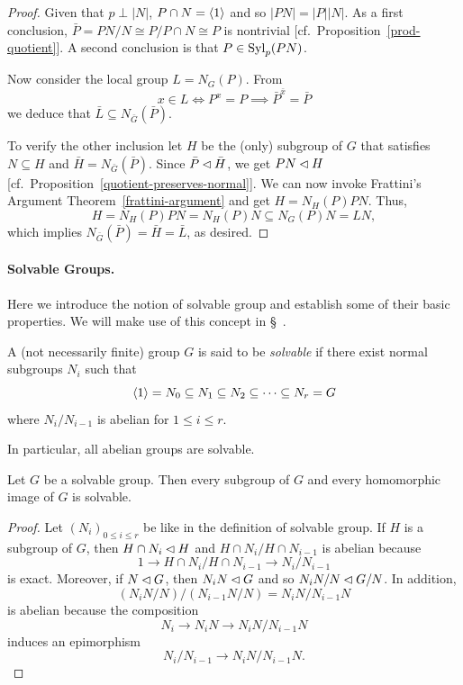 \begin{proof} Given that $p\perp|N|$, $P\cap N=\langle1\rangle$ and so $|PN|=|P||N|$. As a first conclusion, $\bar P=PN/N\cong P/P\cap N\cong P$ is nontrivial [cf.~Proposition~\ref{prod-quotient}]. A second conclusion is that $P\in{\rm Syl}_p(PN)$.

Now consider the local group $L=N_G(P)$. From
$$
    x\in L\iff P^x=P \implies \bar P^{\bar x}=\bar P
$$
we deduce that $\bar L\subseteq N_{\bar G}(\bar P)$.

To verify the other inclusion let $H$ be the (only) subgroup of $G$ that satisfies $N\subseteq H$ and $\bar H=N_{\bar G}(\bar P)$. Since $\bar P\lhd\bar H$, we get $PN\lhd H$ [cf.~Proposition~\ref{quotient-preserves-normal}]. We can now invoke Frattini's Argument Theorem~\ref{frattini-argument} and get $H=N_H(P)PN$. Thus,
$$
    H=N_H(P)PN=N_H(P)N\subseteq N_G(P)N=LN,
$$
which implies $N_{\bar G}(\bar P)=\bar H=\bar L$, as desired.  \end{proof}

\paragraph{Solvable Groups.} Here we introduce the notion of solvable group and establish some of their basic properties. We will make use of this concept in \S~.

\medskip

\begin{defn}\label{solvable-defn}
    A (not necessarily finite) group\/ $G$ is said to be \textsl{solvable} if there exist normal subgroups $N_i$ such that
    $$
        \langle1\rangle=N_0\subseteq N_1\subseteq N_2\subseteq\cdots\subseteq N_r=G
    $$
    where\/ $N_i/N_{i-1}$ is abelian for\/ $1\le i\le r$.

    In particular, all abelian groups are solvable.
\end{defn}


\begin{prop}\label{solvable-subgroups-and-quotients}
    Let\/ $G$ be a solvable group. Then every subgroup of\/ $G$ and every homomorphic image of\/ $G$ is solvable.
\end{prop}

\begin{proof} Let $(N_i)_{0\le i\le r}$ be like in the definition of solvable group. If $H$ is a subgroup of $G$, then $H\cap N_i\lhd H$ and $H\cap N_i/H\cap N_{i-1}$ is abelian because
$$
    1\to H\cap N_i/H\cap N_{i-1} \to N_i/N_{i-1}
$$
is exact. Moreover, if $N\lhd G$, then $N_iN\lhd G$ and so $N_iN/N\lhd G/N$. In addition,
$$
    (N_iN/N)/(N_{i-1}N/N)=N_iN/N_{i-1}N
$$
is abelian because the composition
$$
    N_i\to N_iN\to N_iN/N_{i-1}N
$$
induces an epimorphism
$$
    N_i/N_{i-1}\to N_iN/N_{i-1}N.
$$
 \end{proof}

